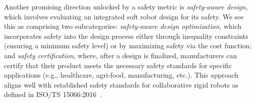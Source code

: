 Another promising direction unlocked by a safety metric is \emph{safety-aware design}, which involves evaluating an integrated soft robot design for its safety. We see this as comprising two subcategories: \emph{safety-aware design optimization}, which incorporates safety into the design process either through inequality constraints (ensuring a minimum safety level) or by maximizing safety via the cost function; and \emph{safety certification}, where, after a design is finalized, manufacturers can certify that their product meets the necessary safety standards for specific applications (e.g., healthcare, agri-food, manufacturing, etc.). This approach aligns well with established safety standards for collaborative rigid robots as defined in ISO/TS 15066:2016~\citep{iso2016collaborative}.

